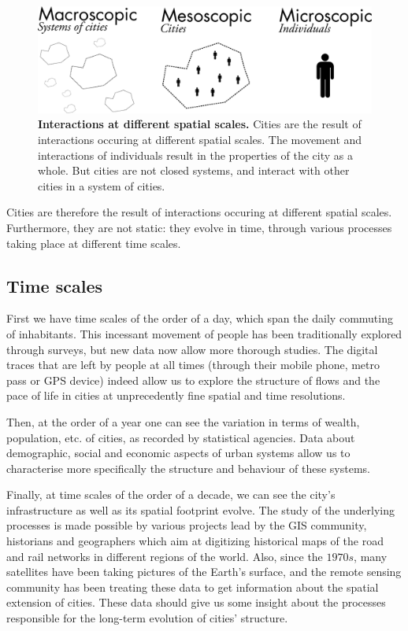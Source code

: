 \begin{figure}[!h]
    \centering
    \includegraphics[width=\textwidth]{./gfx/chapter-intro/spatial_scales.pdf}
    \caption{{\bf Interactions at different spatial scales.} Cities are the
    result of interactions occuring at different spatial scales. The movement
and interactions of individuals result in the properties of the city as a whole.
But cities are not closed systems, and interact with other cities in a system of
cities.\label{fig:spatialscale}}
\end{figure}


Cities are therefore the result of interactions occuring at different spatial
scales. Furthermore, they are not static: they evolve in time, through various
processes taking place at different time scales.



\subsection{Time scales}
\label{ssub:time_scales}

First we have time scales of the order of a day, which span the daily commuting
of inhabitants. This incessant movement of people has been traditionally
explored through surveys, but new data now allow more thorough studies. The
digital traces that are left by people at all times (through their mobile phone,
metro pass or GPS device) indeed allow us to explore the structure of flows and
the pace of life in cities at unprecedently fine spatial and time resolutions.

Then, at the order of a year one can see the variation in terms of wealth,
population, etc. of cities, as recorded by statistical agencies. Data about
demographic, social and economic aspects of urban systems allow us to
characterise more specifically the structure and behaviour of these systems.

Finally, at time scales of the order of a decade, we can see the city's
infrastructure as well as its spatial footprint evolve. The study of the
underlying processes is made possible by various projects lead by the GIS
community, historians and geographers which aim at digitizing historical maps of
the road and rail networks in different regions of the world. Also, since the
$1970s$, many satellites have been taking pictures of the Earth's surface, and
the remote sensing community has been treating these data to get information
about the spatial extension of cities. These data should give us some insight
about the processes responsible for the long-term evolution of cities'
structure.\\

